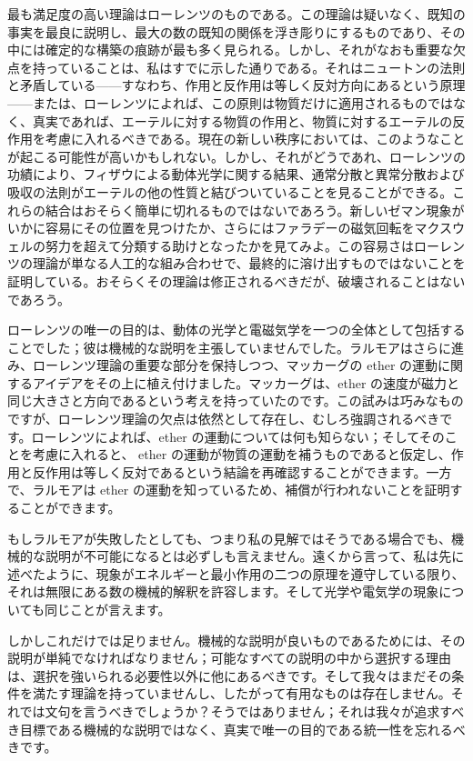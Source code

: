 \documentclass[a4paper,11pt,openany]{ltjsbook}
\begin{document}
最も満足度の高い理論はローレンツのものである。この理論は疑いなく、既知の事実を最良に説明し、最大の数の既知の関係を浮き彫りにするものであり、その中には確定的な構築の痕跡が最も多く見られる。しかし、それがなおも重要な欠点を持っていることは、私はすでに示した通りである。それはニュートンの法則と矛盾している——すなわち、作用と反作用は等しく反対方向にあるという原理——または、ローレンツによれば、この原則は物質だけに適用されるものではなく、真実であれば、エーテルに対する物質の作用と、物質に対するエーテルの反作用を考慮に入れるべきである。現在の新しい秩序においては、このようなことが起こる可能性が高いかもしれない。しかし、それがどうであれ、ローレンツの功績により、フィザウによる動体光学に関する結果、通常分散と異常分散および吸収の法則がエーテルの他の性質と結びついていることを見ることができる。これらの結合はおそらく簡単に切れるものではないであろう。新しいゼマン現象がいかに容易にその位置を見つけたか、さらにはファラデーの磁気回転をマクスウェルの努力を超えて分類する助けとなったかを見てみよ。この容易さはローレンツの理論が単なる人工的な組み合わせで、最終的に溶け出すものではないことを証明している。おそらくその理論は修正されるべきだが、破壊されることはないであろう。

ローレンツの唯一の目的は、動体の光学と電磁気学を一つの全体として包括することでした；彼は機械的な説明を主張していませんでした。ラルモアはさらに進み、ローレンツ理論の重要な部分を保持しつつ、マッカーグの ether の運動に関するアイデアをその上に植え付けました。マッカーグは、ether の速度が磁力と同じ大きさと方向であるという考えを持っていたのです。この試みは巧みなものですが、ローレンツ理論の欠点は依然として存在し、むしろ強調されるべきです。ローレンツによれば、ether の運動については何も知らない；そしてそのことを考慮に入れると、 ether の運動が物質の運動を補うものであると仮定し、作用と反作用は等しく反対であるという結論を再確認することができます。一方で、ラルモアは ether の運動を知っているため、補償が行われないことを証明することができます。

もしラルモアが失敗したとしても、つまり私の見解ではそうである場合でも、機械的な説明が不可能になるとは必ずしも言えません。遠くから言って、私は先に述べたように、現象がエネルギーと最小作用の二つの原理を遵守している限り、それは無限にある数の機械的解釈を許容します。そして光学や電気学の現象についても同じことが言えます。

しかしこれだけでは足りません。機械的な説明が良いものであるためには、その説明が単純でなければなりません；可能なすべての説明の中から選択する理由は、選択を強いられる必要性以外に他にあるべきです。そして我々はまだその条件を満たす理論を持っていませんし、したがって有用なものは存在しません。それでは文句を言うべきでしょうか？そうではありません；それは我々が追求すべき目標である機械的な説明ではなく、真実で唯一の目的である統一性を忘れるべきです。
\end{document}
